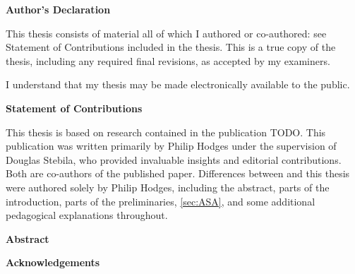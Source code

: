\cleardoublepage %

 \begin{center}\textbf{Author's Declaration}\end{center}
  
 \noindent
This thesis consists of material all of which I authored or co-authored: see Statement of Contributions included in the thesis. This is a true copy of the thesis, including any required final revisions, as accepted by my examiners.
  \bigskip
  
  \noindent
I understand that my thesis may be made electronically available to the public.

\cleardoublepage


 \begin{center}\textbf{Statement of Contributions}\end{center}
 
 \noindent
This thesis is based on research contained in the publication TODO. This publication was written primarily by Philip Hodges under the supervision of Douglas Stebila, who provided invaluable insights and editorial contributions. Both are co-authors of the published paper. Differences between \cite{} and this thesis were authored solely by Philip Hodges, including the abstract, parts of the introduction, parts of the preliminaries, \autoref{sec:ASA}, and some additional pedagogical explanations throughout.


\cleardoublepage


\begin{center}\textbf{Abstract}\end{center}



\cleardoublepage


\begin{center}\textbf{Acknowledgements}\end{center}

